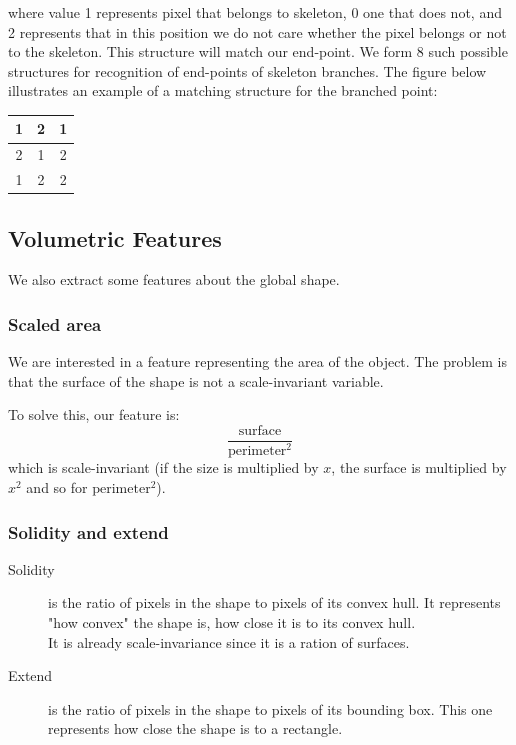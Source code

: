 \documentclass[12pt]{article}
\begin{document}
where value 1 represents pixel that belongs to skeleton, 0 one that does not, and 2 represents that in this position we do not care whether the pixel belongs or not to the skeleton. This structure will match our end-point. We form 8 such possible structures for recognition of end-points of skeleton branches. The figure below illustrates an example of a matching structure for the branched point:
 
\begin{center}
 	\begin{tabular}{| c | c | c |}
 		\hline
			1 & 2 & 1 \\ \hline
			2 & 1 & 2 \\ \hline
			1 & 2 & 2 \\ \hline
	\end{tabular}
\end{center}


\subsection{Volumetric Features}
We also extract some features about the global shape.

\subsubsection{Scaled area}

We are interested in a feature representing the area of the object. The problem is that the surface of the shape is not a scale-invariant variable.

To solve this, our feature is:
$$\frac{\text{surface}}{\text{perimeter}^2}$$
which is scale-invariant (if the size is multiplied by $x$, the surface is multiplied by $x^2$ and so for $\text{perimeter}^2$).

\subsubsection{Solidity and extend}
\begin{description}
  \item[Solidity] is the ratio of pixels in the shape to pixels of its convex hull. It represents "how convex" the shape is, how close it is to its convex hull.\\
  It is already scale-invariance since it is a ration of surfaces.
  \item[Extend] is the ratio of pixels in the shape to pixels of its bounding box. This one represents how close the shape is to a rectangle.
\end{description}
\end{document}
